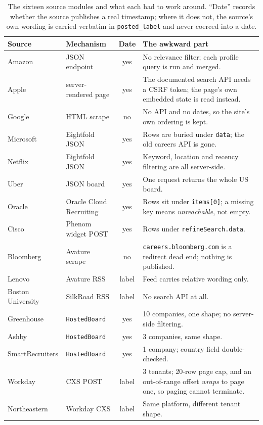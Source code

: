 \documentclass[11pt,a4paper]{article}
\newcommand{\tablefont}{\footnotesize}
\begin{document}
\begin{table}[!ht]
\centering\tablefont
\caption{The sixteen source modules and what each had to work around. ``Date'' records
whether the source publishes a real timestamp; where it does not, the source's own wording
is carried verbatim in \texttt{posted\_\allowbreak{}label} and never coerced into a date.}
\label{tab:sources}
\begin{tabularx}{\textwidth}{L{2.6cm} L{3.0cm} c X}
\toprule
\textbf{Source} & \textbf{Mechanism} & \textbf{Date} & \textbf{The awkward part} \\
\midrule
Amazon & JSON endpoint & yes & No relevance filter; each profile query is run and merged. \\
Apple & server-rendered page & yes & The documented search API needs a CSRF token; the page's
  own embedded state is read instead. \\
Google & HTML scrape & no & No API and no dates, so the site's own ordering is kept. \\
Microsoft & Eightfold JSON & yes & Rows are buried under \texttt{data}; the old careers API
  is gone. \\
Netflix & Eightfold JSON & yes & Keyword, location and recency filtering are all server-side. \\
Uber & JSON board & yes & One request returns the whole US board. \\
Oracle & Oracle Cloud Recruiting & yes & Rows sit under \texttt{items[0]}; a missing key means
  \emph{unreachable}, not empty. \\
Cisco & Phenom widget POST & yes & Rows under \texttt{refineSearch.data}. \\
Bloomberg & Avature scrape & no & \texttt{careers.bloomberg.com} is a redirect dead end;
  nothing is published. \\
Lenovo & Avature RSS & label & Feed carries relative wording only. \\
Boston University & SilkRoad RSS & label & No search API at all. \\
Greenhouse & \texttt{HostedBoard} & yes & 10 companies, one shape; no server-side filtering. \\
Ashby & \texttt{HostedBoard} & yes & 3 companies, same shape. \\
SmartRecruiters & \texttt{HostedBoard} & yes & 1 company; country field double-checked. \\
Workday & CXS POST & label & 3 tenants; 20-row page cap, and an out-of-range offset
  \emph{wraps} to page one, so paging cannot terminate. \\
Northeastern & Workday CXS & label & Same platform, different tenant shape. \\
\bottomrule
\end{tabularx}
\end{table}
\end{document}
